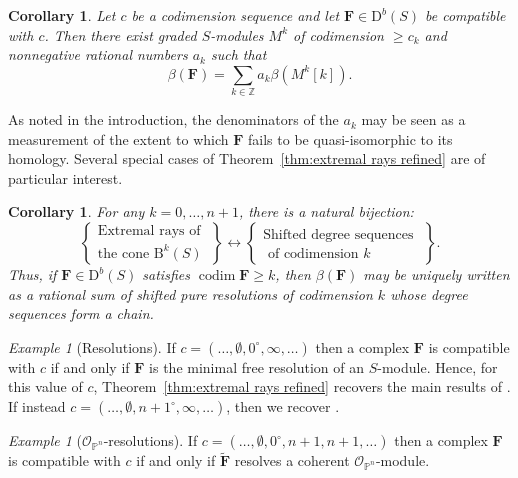 \documentclass[12pt]{amsart}
\newtheorem{cor}[lemma]{Corollary}
\theoremstyle{definition}
\theoremstyle{remark}
\newtheorem{example}[lemma]{Example}
\newcommand{\codim}{\operatorname{codim}}
\newcommand{\PP}{\mathbb{P}}
\newcommand{\ZZ}{\mathbb{Z}}
\newcommand{\cc}{c}
\newcommand{\dd}{d}
\newcommand{\cO}{\mathcal{O}}
\newcommand{\FF}{\mathbf{F}}
\newcommand{\zp}{\circ}
\newcommand{\nothing}{\emptyset}
\newcommand{\DD}{\mathrm{D}}
\newcommand{\BBQ}{\mathrm{B}}
\begin{document}
\begin{cor}\label{cor:decompose refined}
Let $\cc$ be a codimension sequence and let $\FF\in \DD^b(S)$ be compatible with $\cc$.  Then there exist graded $S$-modules $M^k$ of codimension $\geq \cc_k$ and nonnegative rational numbers $a_k$ such that
\[
\beta(\FF)=\sum_{k\in \ZZ} a_k\beta(M^k[k]).
\]
\end{cor}
As noted in the introduction, the denominators of the $a_k$ may be seen as a measurement of the extent to which $\FF$ fails to be quasi-isomorphic to its homology.  Several special cases of Theorem~\ref{thm:extremal rays refined} are of particular interest.

\begin{cor}\label{cor:uniform}
For any $k=0,\dots, n+1$, there is a natural bijection:
\[
\left\{
\begin{matrix}
\text{Extremal rays of }\\
\text{the cone } \BBQ^{k}(S)
\end{matrix}
\right\}
\longleftrightarrow
\left\{
\begin{matrix}
\text{Shifted degree sequences }\\
\text{ of codimension $k$}
\end{matrix}
\right\}.
\]
Thus, if $\FF\in \DD^b(S)$ satisfies $\codim \FF\geq k$, then $\beta(\FF)$ may be uniquely written as a rational sum of shifted pure resolutions of codimension $k$ whose degree sequences form a chain.%
\end{cor}

\begin{example}[Resolutions]\label{ex:resolutions}
If $\cc=(\dots, \nothing, 0^\zp, \infty, \dots)$ then a complex $\FF$ is compatible with $\cc$ if and only if $\FF$ is the minimal free resolution of an $S$-module.  Hence, for this value of $\cc$, Theorem~\ref{thm:extremal rays refined} recovers the main results of \cite{boij-sod2}.  If instead $\cc=(\dots, \nothing, n+1^\zp, \infty, \dots)$, then we recover \cite[Theorem~0.2]{eis-schrey1}.
\end{example}


\begin{example}[$\cO_{\PP^n}$-resolutions]\label{ex:sheaf resolutions}
If $\cc=(\dots,\nothing,0^{\zp},n+1,n+1,\dots)$ then a complex $\FF$ is compatible with $\cc$ if and only if $\widetilde{\FF}$ resolves a coherent $\cO_{\PP^n}$-module.
\end{example}
\end{document}
